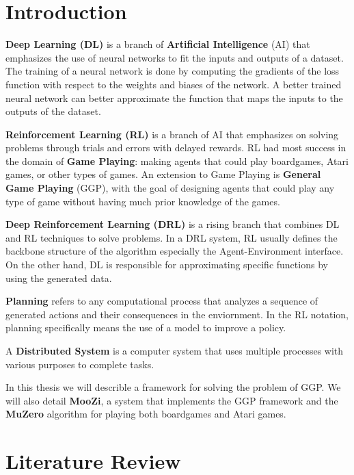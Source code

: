 \documentclass[12pt]{article}
\newcommand{\note}[1]{\todo[color=yellow!40,bordercolor=none,linecolor=black]{#1}}
\begin{document}
\listoftodos

\section{Introduction}

\note{8 - 10 pages of introduction}

\textbf{Deep Learning (DL)} is a branch of \textbf{Artificial Intelligence} (AI) that emphasizes the use of neural networks to fit the inputs and outputs of a dataset.
The training of a neural network is done by computing the gradients of the loss function with respect to the weights and biases of the network.
A better trained neural network can better approximate the function that maps the inputs to the outputs of the dataset.

\textbf{Reinforcement Learning (RL)} is a branch of AI that emphasizes on solving problems through trials and errors with delayed rewards.
RL had most success in the domain of \textbf{Game Playing}: making agents that could play boardgames, Atari games, or other types of games.
An extension to Game Playing is \textbf{General Game Playing} (GGP), with the goal of designing agents that could play any type of game without having much prior knowledge of the games.

\textbf{Deep Reinforcement Learning (DRL)} is a rising branch that combines DL and RL techniques to solve problems.
In a DRL system, RL usually defines the backbone structure of the algorithm especially the Agent-Environment interface.
On the other hand, DL is responsible for approximating specific functions by using the generated data.

\textbf{Planning} refers to any computational process that analyzes a sequence of generated actions and their consequences in the enviornment.
In the RL notation, planning specifically means the use of a model to improve a policy.

A \textbf{Distributed System} is a computer system that uses multiple processes with various purposes to complete tasks.

In this thesis we will describle a framework for solving the problem of GGP.
We will also detail \textbf{MooZi}, a system that implements the GGP framework and the \textbf{MuZero} algorithm for playing both boardgames and Atari games.


\section{Literature Review}
\note{4 - 5 pages}
\end{document}

